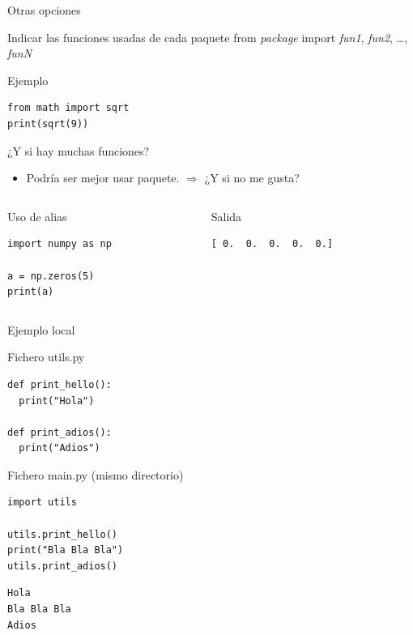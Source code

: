 \documentclass[bigger,unknownkeysallowed]{beamer}
\begin{document}
\begin{frame}[fragile,label={sec:org668547c}]{Otras opciones}
 \begin{block}{Indicar las funciones usadas de cada paquete}
from \emph{package} import \emph{fun1}, \emph{fun2}, \ldots{}, \emph{funN}
\end{block}

\begin{exampleblock}{Ejemplo}
\begin{verbatim}
from math import sqrt
print(sqrt(9))
\end{verbatim}
\end{exampleblock}

\begin{block}{¿Y si hay muchas funciones?}
\begin{itemize}
\item Podría ser mejor usar paquete. \pause \(\Rightarrow\) ¿Y si no me gusta?
\end{itemize}
\pause
\end{block}
\begin{columns}
\begin{column}{0.6\columnwidth}
\begin{exampleblock}{Uso de alias}
\begin{verbatim}
import numpy as np

a = np.zeros(5)
print(a)
\end{verbatim}
\end{exampleblock}
\end{column}

\begin{column}{0.3\columnwidth}
\begin{block}{Salida}
\scriptsize
\begin{verbatim}
[ 0.  0.  0.  0.  0.]
\end{verbatim}
\end{block}
\end{column}
\end{columns}
\end{frame}


\begin{frame}[fragile,label={sec:orgf0a196d}]{Ejemplo local}
 \begin{block}{Fichero utils.py}
\begin{verbatim}
def print_hello():
  print("Hola")

def print_adios():
  print("Adios")
\end{verbatim}
\end{block}

\begin{exampleblock}{Fichero main.py (mismo directorio)}
\begin{verbatim}
import utils

utils.print_hello()
print("Bla Bla Bla")
utils.print_adios()
\end{verbatim}
\scriptsize
\begin{verbatim}
Hola
Bla Bla Bla
Adios
\end{verbatim}
\end{exampleblock}
\end{frame}
\end{document}
